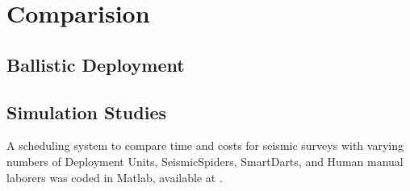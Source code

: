 \section{Comparision}\label{sec:Comparision}

\subsection{Ballistic Deployment}



\subsection{Simulation Studies}

A scheduling system to compare  time and costs for seismic surveys with varying numbers of Deployment Units, SeismicSpiders, SmartDarts, and Human manual laborers was coded in  {\sc Matlab}, available at \cite{Srikanth2016seismicScheduler}.


